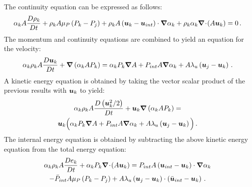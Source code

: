 \begin{appendices}
The continuity equation can be expressed as follows:
\begin{equation}
\label{eq:cont1-app}
\alpha_k A \frac{D \rho_k}{Dt} + \rho_k A \mu_P \left( P_k-P_j \right) + \rho_k A \left( \boldsymbol u_k-\boldsymbol u_{int} \right) \cdot \boldsymbol\nabla \alpha_k + \rho_k \alpha_k \boldsymbol\nabla\! \cdot \! \left( A \boldsymbol u_k \right) = 0 \,.
\end{equation}
The momentum and continuity equations are combined to yield an equation for the velocity:
\begin{equation}
\label{eq:vel1-app}
\alpha_k \rho_k A \frac{D\boldsymbol u_k}{Dt} + \boldsymbol\nabla \left( \alpha_k A P_k \right) = \alpha_k P_k \boldsymbol\nabla A + P_{int} A \boldsymbol\nabla \alpha_k + A \lambda_u \left( \boldsymbol u_j-\boldsymbol u_k \right) \,.
\end{equation}
A kinetic energy equation is obtained by taking the vector scalar product of the previous results with $\boldsymbol u_k$ to yield:
\begin{multline}
\label{eq:kin1-app}
\alpha_k \rho_k A \frac{D\left(\boldsymbol u_k^2/2\right)}{Dt} + \boldsymbol u_k \boldsymbol\nabla \left( \alpha_k A P_k \right) = \\ \boldsymbol u_k  \Big( \alpha_k P_k \boldsymbol\nabla A + P_{int} A \boldsymbol\nabla \alpha_k + A \lambda_u \left( \boldsymbol u_j-\boldsymbol u_k \right) \Big) \,.
\end{multline}
%
The internal energy equation is obtained by subtracting the above kinetic energy equation from the total energy equation:
\begin{multline}\label{eq:internal1}
\alpha_k \rho_k A \frac{D e_k}{Dt} + \alpha_k P_k \boldsymbol\nabla\! \cdot \! \left(A \boldsymbol u_k \right) = 
 P_{int} A \left(\boldsymbol u_{int}-\boldsymbol u_k \right) \cdot \boldsymbol\nabla \alpha_k \\
 - \bar{P}_{int} A \mu_P \left(P_k-P_j \right) + A \lambda_u \left(\boldsymbol u_j-\boldsymbol u_k  \right) \cdot \left(\bar{\boldsymbol u}_{int}-\boldsymbol u_k \right) \,.
\end{multline}


\end{appendices}
